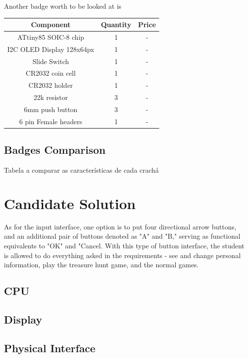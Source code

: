 \documentclass[english]{ist-thesis}
\begin{document}
Another badge worth to be looked at is 

\begin{center}
\begin{tabular}{ |c|c|c| } 
 \hline
 Component & Quantity & Price \\ 
 \hline
 ATtiny85 SOIC-8 chip & 1 & - \\ 
 \hline
 I2C OLED Display 128x64px & 1 & - \\ 
 \hline
 Slide Switch & 1 & - \\ 
 \hline
 CR2032 coin cell & 1 & - \\ 
 \hline
 CR2032 holder & 1 & - \\ 
 \hline
 22k resistor & 3 & - \\ 
 \hline
 6mm push button & 3 & - \\ 
 \hline
 6 pin Female headers & 1 & - \\ 
 \hline
\end{tabular}
\end{center}

\section{Badges Comparison}

Tabela a comparar as características de cada crachá

\chapter{Candidate Solution}

As for the input interface, one option is to put four directional arrow buttons, and an additional pair of buttons denoted as "A" and "B," serving as functional equivalents to "OK" and "Cancel. With this type of button interface, the student is allowed to do everything asked in the requirements - see and change personal information, play the treasure hunt game, and the normal games. 

\section{CPU}

\section{Display}

\section{Physical Interface}
\end{document}
